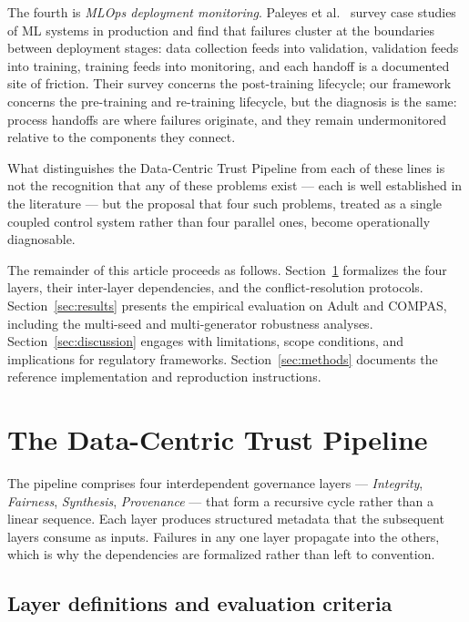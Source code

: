 \documentclass[11pt]{article}
\begin{document}
The fourth is \emph{MLOps deployment monitoring}. Paleyes et al.\ \cite{Paleyes2022Challenges} survey case studies of ML systems in production and find that failures cluster at the boundaries between deployment stages: data collection feeds into validation, validation feeds into training, training feeds into monitoring, and each handoff is a documented site of friction. Their survey concerns the post-training lifecycle; our framework concerns the pre-training and re-training lifecycle, but the diagnosis is the same: process handoffs are where failures originate, and they remain undermonitored relative to the components they connect.

What distinguishes the Data-Centric Trust Pipeline from each of these lines is not the recognition that any of these problems exist --- each is well established in the literature --- but the proposal that four such problems, treated as a single coupled control system rather than four parallel ones, become operationally diagnosable.

The remainder of this article proceeds as follows. Section~\ref{sec:framework} formalizes the four layers, their inter-layer dependencies, and the conflict-resolution protocols. Section~\ref{sec:results} presents the empirical evaluation on Adult and COMPAS, including the multi-seed and multi-generator robustness analyses. Section~\ref{sec:discussion} engages with limitations, scope conditions, and implications for regulatory frameworks. Section~\ref{sec:methods} documents the reference implementation and reproduction instructions.

\section{The Data-Centric Trust Pipeline}
\label{sec:framework}

The pipeline comprises four interdependent governance layers --- \emph{Integrity}, \emph{Fairness}, \emph{Synthesis}, \emph{Provenance} --- that form a recursive cycle rather than a linear sequence. Each layer produces structured metadata that the subsequent layers consume as inputs. Failures in any one layer propagate into the others, which is why the dependencies are formalized rather than left to convention.

\subsection{Layer definitions and evaluation criteria}
\end{document}

